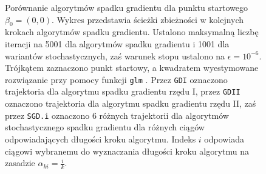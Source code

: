 \begin{figure}[hbt!]
  \caption[Porównanie algorytmów spadku gradientu dla punktu startowego $\beta_0 = (0,0)$.]{\label{fig:scasd}Porównanie algorytmów spadku gradientu dla punktu startowego $\beta_0 = (0,0)$. Wykres przedstawia ścieżki zbieżności w kolejnych krokach algorytmów spadku gradientu. Ustalono maksymalną liczbę iteracji na 5001 dla algorytmów spadku gradientu i 1001 dla wariantów stochastycznych, zaś warunek stopu ustalono na $\epsilon=10^{-6}$. Trójkątem zaznaczono punkt startowy, a kwadratem wyestymowane rozwiązanie przy pomocy funkcji \texttt{glm} \cite{glmglm}. Przez \texttt{GDI} oznaczono trajektoria dla algorytmu spadku gradientu rzędu I, przez \texttt{GDII} oznaczono trajektoria dla algorytmu spadku gradientu rzędu II, zaś przez \texttt{SGD.i} oznaczono 6 różnych trajektorii dla algorytmów stochastycznego spadku gradientu dla różnych ciągów odpowiadających długości kroku algorytmu. Indeks $i$ odpowiada ciągowi wybranemu do wyznaczania długości kroku algorytmu na zasadzie $\alpha_{ki} = \frac{i}{k}$.}
\end{figure}


